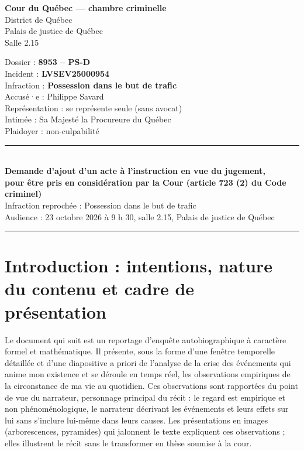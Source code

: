 \documentclass[12pt,letterpaper,oneside]{article}
\begin{document}
\begin{minipage}[t]{0.60\textwidth}
\textbf{Cour du Québec — chambre criminelle}\\
District de Québec\\
Palais de justice de Québec\\
Salle 2.15
\end{minipage}\hfill
\begin{minipage}[t]{0.37\textwidth}
\raggedleft
Dossier : \textbf{8953 – PS-D}\\
Incident : \textbf{LVSEV25000954}\\
Infraction : \textbf{Possession dans le but de trafic}\\
Accusé·e : Philippe Savard\\
Représentation : se représente seule (sans avocat)\\
Intimée : Sa Majesté la Procureure du Québec\\
Plaidoyer : non-culpabilité
\end{minipage}
\vspace{0.8cm}
\begin{center}
\rule{\textwidth}{0.4pt}\\[0.4em]
\textbf{\large Demande d'ajout d'un acte à l'instruction en vue du jugement,}\\[0.15em]\textbf{\large pour être pris en considération par la Cour (article 723 (2) du Code criminel)}\\[0.3em]
Infraction reprochée : Possession dans le but de trafic\\
Audience : 23 octobre 2026 à 9 h 30, salle 2.15, Palais de justice de Québec
\rule{\textwidth}{0.4pt}
\end{center}

\vspace{1em}
\tableofcontents
\newpage

\section*{Introduction : intentions, nature du contenu et cadre de présentation}

Le document qui suit est un reportage d'enquête autobiographique à caractère formel et mathématique. Il présente, sous la forme d'une fenêtre temporelle détaillée et d'une diapositive a priori de l'analyse de la crise des événements qui anime mon existence et se déroule en temps réel, les observations empiriques de la circonstance de ma vie au quotidien. Ces observations sont rapportées du point de vue du narrateur, personnage principal du récit : le regard est empirique et non phénoménologique, le narrateur décrivant les événements et leurs effets sur lui sans s'inclure lui-même dans leurs causes. Les présentations en images (arborescences, pyramides) qui jalonnent le texte expliquent ces observations ; elles illustrent le récit sans le transformer en thèse soumise à la cour.
\end{document}

